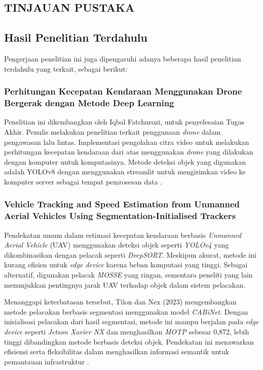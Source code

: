 
\begin{spacing}{1.2}
	\chapter{TINJAUAN PUSTAKA}
\end{spacing}
  
\vspace{4ex}

\section{Hasil Penelitian Terdahulu}
Pengerjaan penelitian ini juga dipengaruhi adanya beberapa hasil penelitian terdahulu yang terkait, sebagai berikut:

\subsection{Perhitungan Kecepatan Kendaraan Menggunakan Drone Bergerak dengan Metode Deep Learning}
\label{subsec:Iqbal2024}
Penelitian ini dikembangkan oleh Iqbal Fatchurozi, untuk penyelesaian Tugas Akhir. Penulis melakukan penelitian terkait penggunaan \emph{drone} dalam pengawasan lalu lintas. Implementasi pengolahan citra video untuk melakukan perhitungan kecepatan kendaraan dari atas menggunakan \emph{drone} yang dilakukan dengan komputer untuk komputasinya. Metode deteksi objek yang digunakan adalah YOLOv8 dengan menggunakan streamlit untuk mengirimkan video ke komputer server sebagai tempat pemrosesan data \cite{Iqbal2024}. 

\subsection{Vehicle Tracking and Speed Estimation from Unmanned Aerial Vehicles Using Segmentation-Initialised Trackers}
\label{subsec:Tilon2023}
Pendekatan umum dalam estimasi kecepatan kendaraan berbasis \emph{Unmanned Aerial Vehicle} (UAV) menggunakan deteksi objek seperti \emph{YOLOv4} yang dikombinasikan dengan pelacak seperti \emph{DeepSORT}. Meskipun akurat, metode ini kurang efisien untuk \emph{edge device} karena beban komputasi yang tinggi. Sebagai alternatif, digunakan pelacak \emph{MOSSE} yang ringan, sementara peneliti yang lain menunjukkan pentingnya jarak UAV terhadap objek dalam sistem pelacakan.

Menanggapi keterbatasan tersebut, Tilon dan Nex (2023) mengembangkan metode pelacakan berbasis segmentasi menggunakan model \emph{CABiNet}. Dengan inisialisasi pelacakan dari hasil segmentasi, metode ini mampu berjalan pada \emph{edge device} seperti \emph{Jetson Xavier NX} dan menghasilkan \emph{MOTP} sebesar 0{,}872, lebih tinggi dibandingkan metode berbasis deteksi objek. Pendekatan ini menawarkan efisiensi serta fleksibilitas dalam menghasilkan informasi semantik untuk pemantauan infrastruktur \cite{Tilon2023}.

